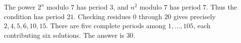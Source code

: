 The power $2^n$ modulo $7$ has period $3$, and $n^2$ modulo $7$ has period $7$. Thus the condition has period $21$. Checking residues $0$ through $20$ gives precisely $2,4,5,6,10,15$. There are five complete periods among $1,\ldots,105$, each contributing six solutions. The answer is $\boxed{30}$.
